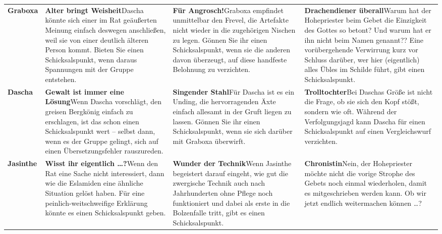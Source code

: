 \documentclass[openright]{Ilaris}
\begin{document}
\begin{tabularx}{0.98\linewidth}{l|XXX}
	&\tkopf{Der Tiefe Rat} & \tkopf{Die Finsterkopp-Binge}&\tkopf{Das Szepter}\\
	\hline
	
	\textbf{Graboxa}&\textbf{Alter bringt Weisheit}\newline Dascha könnte sich einer im Rat geäußerten Meinung einfach deswegen anschließen, weil sie von einer deutlich älteren Person kommt. Bieten Sie einen Schicksalspunkt, wenn daraus Spannungen mit der Gruppe entstehen.
	&\textbf{Für Angrosch!}\newline Graboxa empfindet unmittelbar den Frevel, die Artefakte nicht wieder in die zugehörigen Nischen zu legen. Gönnen Sie ihr einen Schicksalspunkt, wenn sie die anderen davon überzeugt, auf diese handfeste Belohnung zu verzichten.
	& \textbf{Drachendiener überall}\newline Warum hat der Hohepriester beim Gebet die Einzigkeit des Gottes so betont? Und warum hat er ihn nicht beim Namen genannt?? Eine vorübergehende Verwirrung kurz vor Schluss darüber, wer hier (eigentlich) alles Übles im Schilde führt, gibt einen Schicksalspunkt.\\
	
	\textbf{Dascha}&\textbf{Gewalt ist immer eine Lösung}\newline Wenn Dascha vorschlägt, den greisen Bergkönig einfach zu erschlagen, ist das schon einen Schicksalspunkt wert -- selbst dann, wenn es der Gruppe gelingt, sich auf einen Übersetzungsfehler rauszureden. &\textbf{Singender Stahl}\newline Für Dascha ist es ein Unding, die hervorragenden Äxte einfach allesamt in der Gruft liegen zu lassen. Gönnen Sie ihr einen Schicksalspunkt, wenn sie sich darüber mit Graboxa überwirft.&\textbf{Trolltochter}\linebreak Bei Daschas Größe ist nicht die Frage, ob sie sich den Kopf stößt, sondern wie oft. Während der Verfolgungsjagd kann Dascha für einen Schicksalspunkt auf einen Vergleichswurf verzichten.\\
	
	\textbf{Jasinthe}&\textbf{Wisst ihr eigentlich \dots ?}\newline Wenn den Rat eine Sache nicht interessiert, dann wie die Eslamiden eine ähnliche Situation gelöst haben. Für eine peinlich-weitschweifige Erklärung könnte es einen Schicksalspunkt geben.&\textbf{Wunder der Technik}\newline Wenn Jasinthe begeistert darauf eingeht, wie gut die zwergische Technik auch nach Jahrhunderten ohne Pflege noch funktioniert und dabei als erste in die Bolzenfalle tritt, gibt es einen Schicksalspunkt.&\textbf{Chronistin}\newline Nein, der Hohepriester möchte nicht die vorige Strophe des Gebets noch einmal wiederholen, damit es mitgeschrieben werden kann. Ob wir jetzt endlich weitermachen können \dots?\\
	

\end{tabularx}
\end{document}
